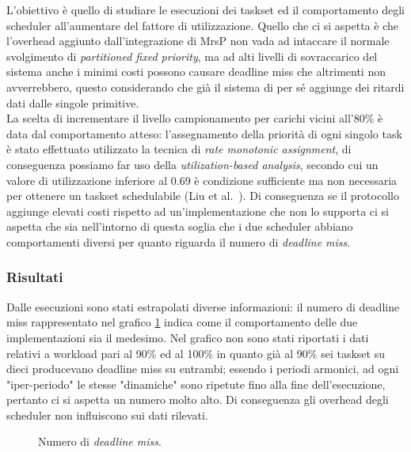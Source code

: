 {\noindent L'obiettivo è quello di studiare le esecuzioni dei taskset ed il comportamento degli scheduler all'aumentare del fattore di utilizzazione. Quello che ci si aspetta è che l'overhead aggiunto dall'integrazione di MrsP non vada ad intaccare il normale svolgimento di \textit{partitioned fixed priority}, ma ad alti livelli di sovraccarico del sistema anche i minimi costi possono causare deadline miss che altrimenti non avverrebbero, questo considerando che già il sistema di per sé aggiunge dei ritardi dati dalle singole primitive.\\

\noindent La scelta di incrementare il livello campionamento per carichi vicini all'80\% è data dal comportamento atteso: l'assegnamento della priorità di ogni singolo task è stato effettuato utilizzato la tecnica di \textit{rate monotonic assignment}, di conseguenza possiamo far uso della \textit{utilization-based analysis}, secondo cui un valore di utilizzazione inferiore al 0.69 è condizione sufficiente ma non necessaria per ottenere un taskset schedulabile (Liu et al.~\cite{Liu:1973:SAM:321738.321743}). Di conseguenza se il protocollo aggiunge elevati costi rispetto ad un'implementazione che non lo supporta ci si aspetta che sia nell'intorno di questa soglia che i due scheduler abbiano comportamenti diversi per quanto riguarda il numero di \textit{deadline miss}.\\

\subsubsection{Risultati}
\label{sec:confronto_norisorsa_ris}

\noindent Dalle esecuzioni sono stati estrapolati diverse informazioni: il numero di deadline miss rappresentato nel grafico \ref{fig:DLM} indica come il comportamento delle due implementazioni sia il medesimo. Nel grafico non sono stati riportati i dati relativi a workload pari al 90\% ed al 100\% in quanto già al 90\% sei taskset su dieci producevano deadline miss su entrambi; essendo i periodi armonici, ad ogni "iper-periodo" le stesse "dinamiche" sono ripetute fino alla fine dell'esecuzione, pertanto ci si aspetta un numero molto alto. Di conseguenza gli overhead degli scheduler non influiscono sui dati rilevati.\\

  \begin{figure}
    \graficoUno
    \caption{Numero di \textit{deadline miss}.} %
    \label{fig:DLM}
  \end{figure}

}
